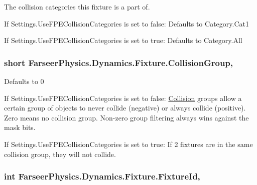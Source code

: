 The collision categories this fixture is a part of. 

If Settings.\+Use\+F\+P\+E\+Collision\+Categories is set to false\+: Defaults to Category.\+Cat1

If Settings.\+Use\+F\+P\+E\+Collision\+Categories is set to true\+: Defaults to Category.\+All \hypertarget{class_farseer_physics_1_1_dynamics_1_1_fixture_a693bdde88d589d83e26586bdce516045}{
\subsubsection[{Collision\+Group}]{\setlength{\rightskip}{0pt plus 5cm}short Farseer\+Physics.\+Dynamics.\+Fixture.\+Collision\+Group\hspace{0.3cm}{\ttfamily [get]}, {\ttfamily [set]}}}\label{class_farseer_physics_1_1_dynamics_1_1_fixture_a693bdde88d589d83e26586bdce516045}


Defaults to 0 

If Settings.\+Use\+F\+P\+E\+Collision\+Categories is set to false\+: \hyperlink{namespace_farseer_physics_1_1_collision}{Collision} groups allow a certain group of objects to never collide (negative) or always collide (positive). Zero means no collision group. Non-\/zero group filtering always wins against the mask bits.

If Settings.\+Use\+F\+P\+E\+Collision\+Categories is set to true\+: If 2 fixtures are in the same collision group, they will not collide. \hypertarget{class_farseer_physics_1_1_dynamics_1_1_fixture_a0af0240198acd437e8e17b01b1908bcc}{
\subsubsection[{Fixture\+Id}]{\setlength{\rightskip}{0pt plus 5cm}int Farseer\+Physics.\+Dynamics.\+Fixture.\+Fixture\+Id\hspace{0.3cm}{\ttfamily [get]}, {\ttfamily [set]}}}\label{class_farseer_physics_1_1_dynamics_1_1_fixture_a0af0240198acd437e8e17b01b1908bcc}


